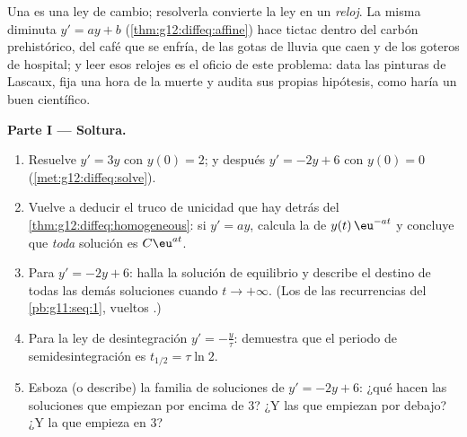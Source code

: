 \begin{problem}
\label{pb:g12:diffeq:1}
Una  es una ley de cambio; resolverla convierte la ley
en un \emph{reloj}. La misma  diminuta $y' = ay + b$
(\cref{thm:g12:diffeq:affine}) hace tictac dentro del carbón prehistórico,
del café que se enfría, de las gotas de lluvia que caen y de los goteros de
hospital; y leer esos relojes es el oficio de este problema: data las
pinturas de Lascaux, fija una hora de la muerte y audita sus propias
hipótesis, como haría un buen científico.

\medskip
\noindent\textbf{Parte I --- Soltura.}
\begin{enumerate}
  \item Resuelve $y' = 3y$ con $y(0) = 2$; y después $y' = -2y + 6$ con
        $y(0) = 0$ (\cref{met:g12:diffeq:solve}).
  \item Vuelve a deducir el truco de unicidad que hay detrás del
        \cref{thm:g12:diffeq:homogeneous}: si $y' = ay$, calcula la
         de $y(t)\,\eu^{-at}$ y concluye que \emph{toda} solución
        es $C\eu^{at}$.
  \item Para $y' = -2y + 6$: halla la solución de equilibrio y describe el
        destino de todas las demás soluciones cuando $t \to +\infty$. (Los
         de las recurrencias del \cref{pb:g11:seq:1}, vueltos
        .)
  \item Para la ley de desintegración $y' = -\frac{y}{\tau}$: demuestra que
        el periodo de semidesintegración es $t_{1/2} = \tau \ln 2$.
  \item Esboza (o describe) la familia de soluciones de $y' = -2y + 6$:
        ¿qué hacen las soluciones que empiezan por encima de $3$? ¿Y las
        que empiezan por debajo? ¿Y la que empieza en $3$?
\end{enumerate}


\end{problem}
